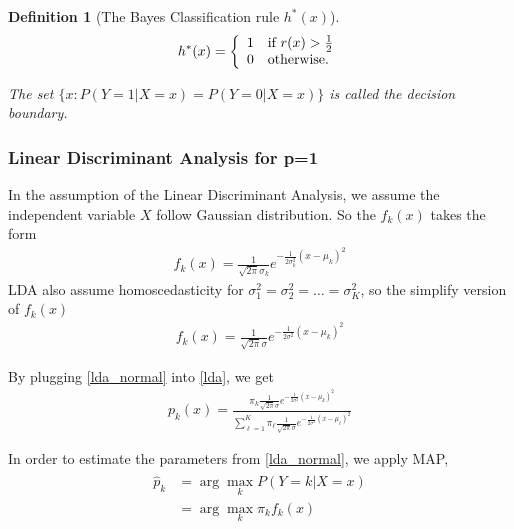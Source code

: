 \documentclass[12pt,a4paper]{article}%
\newtheorem{definition}{Definition}
\theoremstyle{definition}
\theoremstyle{plain}
\numberwithin{equation}{section}
\begin{document}
\begin{framed}
\begin{definition}[The Bayes Classification rule $h^{*}(x)$]
~\\
\begin{gather*}
h^{*}(x) = \left\{
  \begin{array}{ll}
    1 & \mbox{\rm if } r(x)> \frac{1}{2}\\
    0 & \mbox{\rm otherwise.} \\
   \end{array} \right.
\end{gather*}

The set $\{x : P(Y=1|X=x) = P(Y=0|X=x) \}$ is called the decision boundary.

\end{definition}
\end{framed}


\subsubsection{\textbf{Linear Discriminant Analysis for p=1}}
In the assumption of the Linear Discriminant Analysis, we assume the independent variable $X$ follow Gaussian distribution.
So the $f_{k}(x)$ takes the form
\begin{gather}
f_{k}(x) = \frac{1}{\sqrt{2\pi}\sigma_{k}}e^{-\frac{1}{2\sigma_{k}^{2}}(x-\mu_{k})^{2}}
\end{gather}
LDA also assume homoscedasticity for $\sigma_{1}^{2}=\sigma_{2}^{2}=\dots=\sigma_{K}^{2}$, so the simplify version of $f_{k}(x)$
\begin{gather}
f_{k}(x) = \frac{1}{\sqrt{2\pi}\sigma}e^{-\frac{1}{2\sigma^{2}}(x-\mu_{k})^{2}}
\label{lda_normal}
\end{gather}

By plugging \eqref{lda_normal} into \eqref{lda}, we get
\begin{gather}
p_{k}(x) = \frac{\pi_{k} \frac{1}{\sqrt{2\pi}\sigma}e^{-\frac{1}{2\sigma^{2}}(x-\mu_{k})^{2}}}{\sum\limits_{\ell=1}^{K}\pi_{\ell} \frac{1}{\sqrt{2\pi}\sigma}e^{-\frac{1}{2\sigma^{2}}(x-\mu_{\ell})^{2}}}
\end{gather}

In order to estimate the parameters from \eqref{lda_normal}, we apply MAP,
\begin{align}
\begin{split}
\hat{p}_{k} &= \arg\max_{k} P(Y=k|X=x) \\
		    &= \arg\max_{k} \pi_{k}f_{k}(x)\\
\end{split}
\label{MAP}
\end{align}
\end{document}
